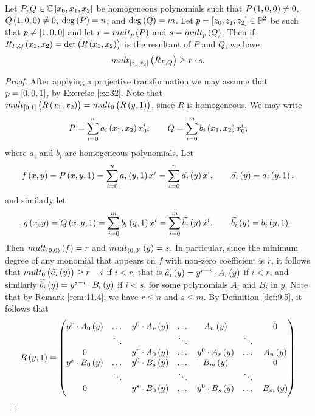 \begin{lemma}
\label{lem:11.7}
Let $ P, Q \in \C\sbr{x_0, x_1, x_2} $ be homogeneous polynomials such that $ P\br{1, 0, 0} \ne 0 $, $ Q\br{1, 0, 0} \ne 0 $, $ \deg\br{P} = n $, and $ \deg\br{Q} = m $. Let $ p = \sbr{z_0, z_1, z_2} \in \P^2 $ be such that $ p \ne \sbr{1, 0, 0} $ and let $ r = mult_p\br{P} $ and $ s = mult_p\br{Q} $. Then if $ R_{P, Q}\br{x_1, x_2} = \det\br{R\br{x_1, x_2}} $ is the resultant of $ P $ and $ Q $, we have
$$ mult_{\sbr{z_1, z_2}}\br{R_{P, Q}} \ge r \cdot s. $$
\end{lemma}

\begin{proof}
After applying a projective transformation we may assume that $ p = \sbr{0, 0, 1} $, by Exercise \ref{ex:32}. Note that $ mult_{\sbr{0, 1}}\br{R\br{x_1, x_2}} = mult_0\br{R\br{y, 1}} $, since $ R $ is homogeneous. We may write
$$ P = \sum_{i = 0}^n a_i\br{x_1, x_2}x_0^i, \qquad Q = \sum_{i = 0}^m b_i\br{x_1, x_2}x_0^i, $$
where $ a_i $ and $ b_i $ are homogeneous polynomials. Let
$$ f\br{x, y} = P\br{x, y, 1} = \sum_{i = 0}^n a_i\br{y, 1}x^i = \sum_{i = 0}^n \widetilde{a_i}\br{y}x^i, \qquad \widetilde{a_i}\br{y} = a_i\br{y, 1}, $$
and similarly let
$$ g\br{x, y} = Q\br{x, y, 1} = \sum_{i = 0}^m b_i\br{y, 1}x^i = \sum_{i = 0}^m \widetilde{b_i}\br{y}x^i, \qquad \widetilde{b_i}\br{y} = b_i\br{y, 1}. $$
Then $ mult_{\br{0, 0}}\br{f} = r $ and $ mult_{\br{0, 0}}\br{g} = s $. In particular, since the minimum degree of any monomial that appears on $ f $ with non-zero coefficient is $ r $, it follows that $ mult_0\br{\widetilde{a_i}\br{y}} \ge r - i $ if $ i < r $, that is $ \widetilde{a_i}\br{y} = y^{r - i} \cdot A_i\br{y} $ if $ i < r $, and similarly $ \widetilde{b_i}\br{y} = y^{s - i} \cdot B_i\br{y} $ if $ i < s $, for some polynomials $ A_i $ and $ B_i $ in $ y $. Note that by Remark \ref{rem:11.4}, we have $ r \le n $ and $ s \le m $. By Definition \ref{def:9.5}, it follows that
$$ R\br{y, 1} =
\begin{pmatrix}
y^r \cdot A_0\br{y} & \dots & y^0 \cdot A_r\br{y} & \dots & A_n\br{y} & & 0 \\
& \ddots & & \ddots & & \ddots & \\
0 & & y^r \cdot A_0\br{y} & \dots & y^0 \cdot A_r\br{y} & \dots & A_n\br{y} \\
y^s \cdot B_0\br{y} & \dots & y^0 \cdot B_s\br{y} & \dots & B_m\br{y} & & 0 \\
& \ddots & & \ddots & & \ddots & \\
0 & & y^s \cdot B_0\br{y} & \dots & y^0 \cdot B_s\br{y} & \dots & B_m\br{y}

\end{pmatrix}$$
\end{proof}
